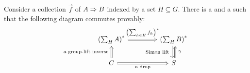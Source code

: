 \begin{lemma}\label{lem:simon-exchange-component-wise}
    Consider a collection $\vec f$ of  $A \Rightarrow B$ indexed by a set $H \subseteq G$. There is a  and a  such that the following diagram commutes provably:
    \[
    \begin{tikzcd}[column sep=1.5cm]
        \left( \sum_H A \right)^* 
        \ar[r, \dropar, "{\left( \sum_{h \in H} f_h \right)^*}"{yshift=0.5ex}]
        &\left( \sum_H B \right)^*
        \ar[d, shift right=0.5ex, "\text{Simon lift}"'{xshift=-0.5ex}]
        \\ 
        C 
        \ar[u, \dropar, "\text{a group-lift inverse}"{xshift=-0.5ex}]
        \ar[r, \dropar, "\text{a drop}"']
        &S
        \ar[u, \dropar, shift right=0.5ex, "\gamma"'{xshift=0.5ex}]
    \end{tikzcd}
    \]
\end{lemma}
